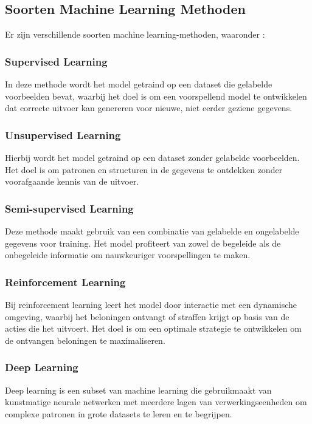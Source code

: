 \subsection{Soorten Machine Learning Methoden}

Er zijn verschillende soorten machine learning-methoden, waaronder \autocite{Mahesh2019}:

\subsubsection{Supervised Learning}
In deze methode wordt het model getraind op een dataset die gelabelde voorbeelden bevat, waarbij het doel is om een voorspellend model te ontwikkelen dat correcte uitvoer kan genereren voor nieuwe, niet eerder geziene gegevens.

\subsubsection{Unsupervised Learning}
Hierbij wordt het model getraind op een dataset zonder gelabelde voorbeelden. Het doel is om patronen en structuren in de gegevens te ontdekken zonder voorafgaande kennis van de uitvoer.

\subsubsection{Semi-supervised Learning}
Deze methode maakt gebruik van een combinatie van gelabelde en ongelabelde gegevens voor training. Het model profiteert van zowel de begeleide als de onbegeleide informatie om nauwkeuriger voorspellingen te maken.

\subsubsection{Reinforcement Learning}
Bij reinforcement learning leert het model door interactie met een dynamische omgeving, waarbij het beloningen ontvangt of straffen krijgt op basis van de acties die het uitvoert. Het doel is om een optimale strategie te ontwikkelen om de ontvangen beloningen te maximaliseren\autocite{Mahesh2019}.

\subsubsection{Deep Learning}
Deep learning is een subset van machine learning die gebruikmaakt van kunstmatige neurale netwerken met meerdere lagen van verwerkingseenheden om complexe patronen in grote datasets te leren en te begrijpen.

